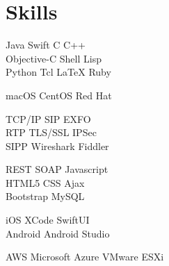 \documentclass[a4paper]{lyu-resume} %
\begin{document}
\begin{minipage}[t]{0.33\textwidth} %


\section{Skills}

Java \textbullet{} Swift \textbullet{} C \textbullet{} C++\\
Objective-C \textbullet{} Shell \textbullet{} Lisp \\
Python \textbullet{} Tcl \textbullet{} \LaTeX \textbullet{} Ruby\\

\vspace{2 mm}

macOS \textbullet{} CentOS \textbullet{} Red Hat \\

\vspace{2 mm}

TCP/IP \textbullet{} SIP \textbullet{} EXFO  \\
\textbullet{} RTP \textbullet{} TLS/SSL \textbullet{} IPSec \\
SIPP \textbullet{} Wireshark \textbullet{} Fiddler \\

\vspace{2 mm}

REST \textbullet{} SOAP \textbullet{} Javascript \\
HTML5 \textbullet{} CSS \textbullet{} Ajax \\ 
Bootstrap \textbullet{} MySQL \\ 

\vspace{2 mm}

iOS \textbullet{} XCode \textbullet{} SwiftUI \\ 
Android \textbullet{} Android Studio \\

\vspace{2 mm}

AWS \textbullet{} Microsoft Azure \textbullet{} VMware ESXi \\


\end{minipage}
\end{document}
